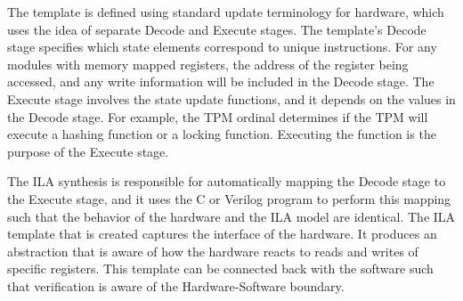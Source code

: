 The template is defined using standard update terminology for hardware, which
uses the idea of separate Decode and Execute stages.
The template's Decode stage specifies which state elements correspond to unique
instructions.
For any modules with memory mapped registers, the address of the register being
accessed, and any write information will be included in the Decode stage. 
The Execute stage involves the state update functions, and it depends on the
values in the Decode stage.
For example, the TPM ordinal determines if the TPM will execute a hashing
function or a locking function.
Executing the function is the purpose of the Execute stage.

The ILA synthesis is responsible for automatically mapping the Decode stage to
the Execute stage, and it uses the C or Verilog program to perform this mapping
such that the behavior of the hardware and the ILA model are identical.
The ILA template that is created captures the interface of the hardware.
It produces an abstraction that is aware of how the hardware reacts to reads and
writes of specific registers.
This template can be connected back with the software such that verification is
aware of the Hardware-Software boundary.
